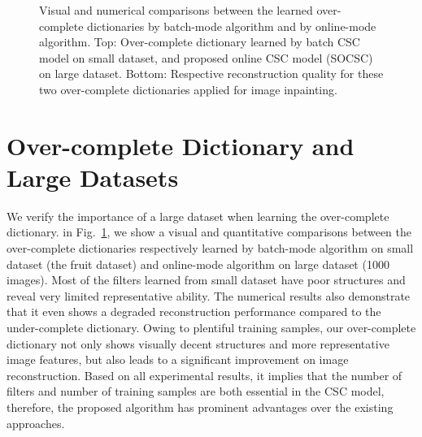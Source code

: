 \documentclass{egpubl}
\begin{document}
\begin{figure}[h]
  \caption{ Visual and numerical comparisons between the learned over-complete dictionaries by batch-mode algorithm and by online-mode algorithm. Top: Over-complete dictionary learned by batch CSC model on small dataset, and proposed online CSC model (SOCSC) on large dataset. Bottom: Respective reconstruction quality for these two over-complete dictionaries applied for image inpainting.}
  \label{fig:overCompleteDic-dataset}
\end{figure}

\section{Over-complete Dictionary and Large Datasets}

We verify the importance of a large dataset when learning the over-complete dictionary. in Fig.~\ref{fig:overCompleteDic-dataset}, we show a visual and quantitative comparisons between the over-complete dictionaries respectively learned by batch-mode algorithm on small dataset (the fruit dataset) and online-mode algorithm on large dataset (1000 images). Most of the filters learned from small dataset have poor structures and reveal very limited representative ability. The numerical results also demonstrate that it even shows a degraded reconstruction performance compared to the under-complete dictionary. Owing to plentiful training samples, our over-complete dictionary not only shows visually decent structures and more representative image features, but also leads to a significant improvement on image reconstruction. Based on all experimental results, it implies that the number of filters and number of training samples are both essential in the CSC model, therefore, the proposed algorithm has prominent advantages over the existing approaches.
\end{document}
